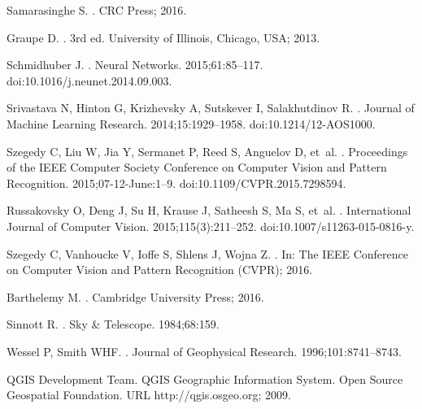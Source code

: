 Samarasinghe S.
.
\newblock CRC Press; 2016.

Graupe D.
.
\newblock 3rd ed. University of Illinois, Chicago, USA; 2013.

Schmidhuber J.
.
\newblock Neural Networks. 2015;61:85--117.
\newblock doi:{10.1016/j.neunet.2014.09.003}.

Srivastava N, Hinton G, Krizhevsky A, Sutskever I, Salakhutdinov R.
.
\newblock Journal of Machine Learning Research. 2014;15:1929--1958.
\newblock doi:{10.1214/12-AOS1000}.

Szegedy C, Liu W, Jia Y, Sermanet P, Reed S, Anguelov D, et~al.
.
\newblock Proceedings of the IEEE Computer Society Conference on Computer
  Vision and Pattern Recognition. 2015;07-12-June:1--9.
\newblock doi:{10.1109/CVPR.2015.7298594}.

Russakovsky O, Deng J, Su H, Krause J, Satheesh S, Ma S, et~al.
.
\newblock International Journal of Computer Vision. 2015;115(3):211--252.
\newblock doi:{10.1007/s11263-015-0816-y}.

Szegedy C, Vanhoucke V, Ioffe S, Shlens J, Wojna Z.
.
\newblock In: The IEEE Conference on Computer Vision and Pattern Recognition
  (CVPR); 2016.

Barthelemy M.
.
\newblock Cambridge University Press; 2016.

Sinnott R.
.
\newblock Sky {\&} Telescope. 1984;68:159.

Wessel P, Smith WHF.
.
\newblock Journal of Geophysical Research. 1996;101:8741--8743.

{QGIS Development Team}. {QGIS Geographic Information System. Open Source
  Geospatial Foundation. URL http://qgis.osgeo.org}; 2009.

